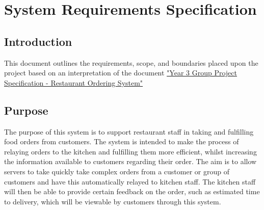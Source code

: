 \documentclass[11pt, a4paper]{report}
\begin{document}
\chapter{System Requirements Specification}

\tableofcontents
\pagebreak

\section{Introduction} \label{sec:Intro}

This document outlines the requirements, scope, and boundaries placed upon the project based on an interpretation of the document \href{http://www.macs.hw.ac.uk/~rpp6/teaching/GroupProject/docs/project/GroupProjectSpec2017.pdf}{"Year 3 Group Project Specification - Restaurant Ordering System"}

\section{Purpose} \label{sec:purpose}

The purpose of this system is to support restaurant staff in taking and fulfilling food orders from customers. The system is intended to make the process of relaying orders to the kitchen and fulfilling them more efficient, whilst increasing the information available to customers regarding their order. The aim is to allow servers to take quickly take complex orders from a customer or group of customers and have this automatically relayed to kitchen staff. The kitchen staff will then be able to provide certain feedback on the order, such as estimated time to delivery, which will be viewable by customers through this system.
\end{document}
